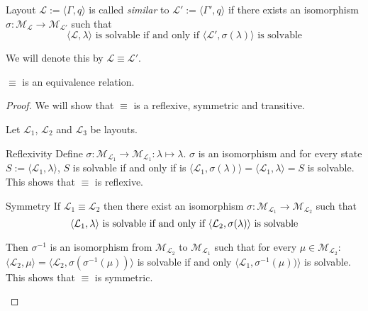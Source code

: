 \begin{definition}
	Layout $\mathcal{L}:=\langle\Gamma,q\rangle$ is called \emph{similar} to
	$\mathcal{L}':=\langle\Gamma',q\rangle$ if there exists an isomorphism
	$\sigma : \mathcal{M}_{\mathcal{L}} \rightarrow
	\mathcal{M}_{\mathcal{L}'}$ such that
	\[
		\langle\mathcal{L},\lambda\rangle \text{ is solvable}
		\text{ if and only if }
		\langle\mathcal{L}',\sigma(\lambda)\rangle \text{ is solvable}
	\]
	
	We will denote this by $\mathcal{L} \equiv \mathcal{L}'$. 
\end{definition}

\begin{theorem}
	$\equiv$ is an equivalence relation.
\end{theorem}

\begin{proof}
	We will show that $\equiv$ is a reflexive, symmetric and transitive.
	
	Let $\mathcal{L}_{1}$, $\mathcal{L}_{2}$ and $\mathcal{L}_{3}$ be
	layouts.
	\begin{namedlist}[Transitivity]
		\item[Reflexivity] Define $\sigma :
		\mathcal{M}_{\mathcal{L}_{1}} \rightarrow
		\mathcal{M}_{\mathcal{L}_{1}} : \lambda \mapsto \lambda$.
		$\sigma$ is an isomorphism and for every state
		$S:=\langle\mathcal{L}_{1},\lambda\rangle$, $S$ is solvable if
		and only if is 	$\langle\mathcal{L}_{1},\sigma(\lambda)\rangle =
		\langle\mathcal{L}_{1},\lambda\rangle = S$ is solvable. This
		shows that $\equiv$ is reflexive.
		
		\item[Symmetry] If $\mathcal{L}_{1} \equiv \mathcal{L}_{2}$ then
		there exist an isomorphism $\sigma :
		\mathcal{M}_{\mathcal{L}_{1}} \rightarrow
		\mathcal{M}_{\mathcal{L}_{2}}$ such that 
		\[
			\langle\mathcal{L}_{1},\lambda\rangle \text{ is solvable if and only if } \langle\mathcal{L}_{2},\sigma(\lambda)\rangle \text{ is solvable} \\
		\]
		
		Then $\sigma^{-1}$ is an isomorphism from
		$\mathcal{M}_{\mathcal{L}_{2}}$ to
		$\mathcal{M}_{\mathcal{L}_{1}}$ such that for every $\mu \in
		\mathcal{M}_{\mathcal{L}_{2}}$: $\langle \mathcal{L}_{2}, \mu
		\rangle = \langle \mathcal{L}_{2}, \sigma(\sigma^{-1}(\mu))
		\rangle$ is solvable if and only $\langle \mathcal{L}_{1},
		\sigma^{-1}(\mu)) \rangle$ is solvable. This shows that $\equiv$
		is symmetric. 
				

\end{namedlist}
\end{proof}
